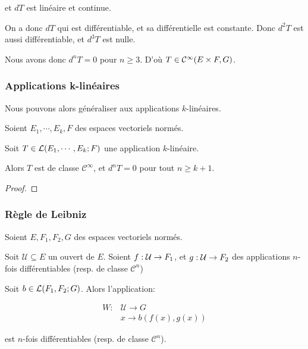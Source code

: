 et $dT$ est linéaire et continue.

On a donc $dT$ qui est différentiable, et sa différentielle est constante.
Donc $d^{2}T$ est aussi différentiable, et $d^{3}T$ est nulle.

Nous avons donc $d^{n}T = 0$ pour $n \geq 3$. D'où $T \in
\mathcal{C}^{\infty}(E \times F, G)$.

\subsubsection{Applications k-linéaires}

Nous pouvons alors généraliser aux applications $k$-linéaires.

\begin{proposition}
	Soient $E_{1}, \cdots, E_{k}, F$ des espaces vectoriels normés.

	Soit $T \in \mathcal{L}(E_{1}, \cdots, E_{k}; F)$ une application
	$k$-linéaire.

	Alors $T$ est de classe $\mathcal{C}^{\infty}$, et $d^{n}T = 0$ pour tout $n
	\geq k + 1$.
\end{proposition}

\begin{proof}

\end{proof}

\subsubsection{Règle de Leibniz}

\begin{proposition}
	Soient $E, F_{1}, F_{2}, G$ des espaces vectoriels normés.

	Soit $\mathcal{U} \subseteq E$ un ouvert de $E$.
	Soient $f : \mathcal{U} \rightarrow F_{1}$, et
	$g : \mathcal{U} \rightarrow F_{2}$ des applications $n$-fois différentiables
	(resp. de classe $\mathcal{C}^{n}$)

	Soit $b \in \mathcal{L}(F_{1}, F_{2}; G)$.
	Alors l'application:

	\begin{align*}
		W : & \mathcal{U} \rightarrow G \\
			& x \rightarrow b(f(x), g(x))
	\end{align*}

	est $n$-fois différentiables (resp. de classe $\mathcal{C}^{n}$).
\end{proposition}

